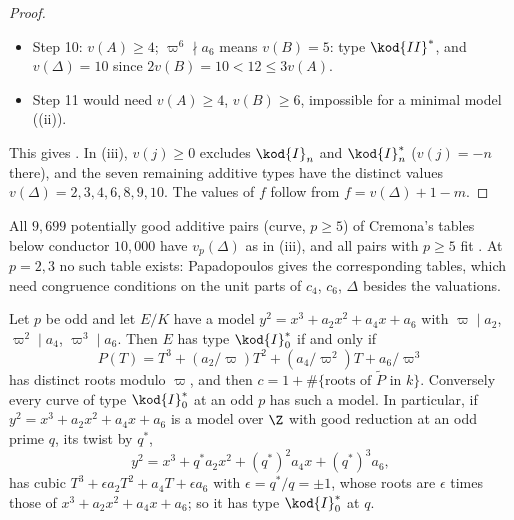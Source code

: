 \begin{proof}
\begin{itemize}
$v(A)=3$: type $\kod{III}^*$, and $v(\Delta)=9$ since $3v(A)=9<10\le2v(B)$.
\item Step 10: $v(A)\ge4$; $\varpi^6\nmid a_6$ means $v(B)=5$: type $\kod{II}^*$, and $v(\Delta)=10$ since $2v(B)=10<12\le3v(A)$.
\item Step 11 would need $v(A)\ge4$, $v(B)\ge6$, impossible for a minimal model ((ii)).
\end{itemize}
This gives . In (iii), $v(j)\ge0$ excludes $\kod{I}_n$ and $\kod{I}_n^*$ ($v(j)=-n$ there), and
the seven remaining additive types have the distinct values $v(\Delta)=2,3,4,6,8,9,10$. The values of $f$ follow from
$f=v(\Delta)+1-m$.
\end{proof}

All $9{,}699$ potentially good additive pairs (curve, $p\ge5$) of Cremona's tables below conductor $10{,}000$ have
$v_p(\Delta)$ as in (iii), and all pairs with $p\ge5$ fit . At $p=2,3$ no such table exists:
Papadopoulos \cite{Papadopoulos93} gives the corresponding tables, which need congruence conditions on the unit
parts of $c_4$, $c_6$, $\Delta$ besides the valuations.

\begin{proposition}\label{prop:reduction:I0star-cubic}
Let $p$ be odd and let $E/K$ have a model $y^2=x^3+a_2x^2+a_4x+a_6$ with $\varpi\mid a_2$, $\varpi^2\mid a_4$, $\varpi^3\mid a_6$.
Then $E$ has type $\kod{I}_0^*$ if and only if
\[
P(T)=T^3+(a_2/\varpi)T^2+(a_4/\varpi^2)T+a_6/\varpi^3
\]
has distinct roots modulo $\varpi$, and then $c=1+\#\{\text{roots of }\tilde P\text{ in }k\}$. Conversely every curve of
type $\kod{I}_0^*$ at an odd $p$ has such a model. In particular, if $y^2=x^3+a_2x^2+a_4x+a_6$ is a model over $\Z$ with
good reduction at an odd prime $q$, its twist by $q^*$,
\[
y^2=x^3+q^*a_2x^2+(q^*)^2a_4x+(q^*)^3a_6,
\]
has cubic $T^3+\epsilon a_2T^2+a_4T+\epsilon a_6$ with $\epsilon=q^*/q=\pm1$, whose roots are $\epsilon$ times those of
$x^3+a_2x^2+a_4x+a_6$; so it has type $\kod{I}_0^*$ at $q$.
\end{proposition}

